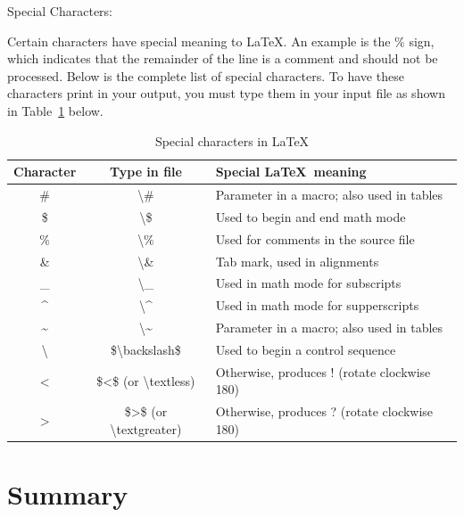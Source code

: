 \documentclass[a4paper,11pt,UTF8,openright]{book}
\begin{document}
Special Characters:

Certain characters have special meaning to \LaTeX. An example is the \% sign, which indicates that the remainder of the line is a comment and should not be processed. Below is the complete list of special characters. To have these characters print in your output, you must type them in your input file as shown in Table~\ref{tab:special characters} below.

\begin{center}
  \begin{table}[!htbp]
    \caption{Special characters in \LaTeX}
    \label{tab:special characters}
    \begin{tabular}{@{}ccl@{}}
      \toprule
      \textbf{Character} & \textbf{Type in file} & \textbf{Special \LaTeX\ meaning}  \\ 
      \midrule
      \#	& \textbackslash\# & Parameter in a macro; also used in tables \\
      \$	& \textbackslash\$ & Used to begin and end math mode \\
      \%	& \textbackslash\% & Used for comments in the source file \\
      \&	& \textbackslash\& & Tab mark, used in alignments \\
      \_	& \textbackslash\_ & Used in math mode for subscripts \\
      \^{}	& \textbackslash\^{} & Used in math mode for supperscripts \\
      \~{}	& \textbackslash\~{} & Parameter in a macro; also used in tables \\
      \textbackslash	& \$\textbackslash backslash\$ & Used to begin a control sequence \\
      $<$	& \$<\$ (or \textbackslash textless) & Otherwise, produces ! (rotate clockwise 180\degree) \\
      $>$	& \$>\$ (or \textbackslash textgreater) & Otherwise, produces ? (rotate clockwise 180\degree) \\
      \bottomrule
    \end{tabular}
  \end{table}
\end{center}



\chapter{Summary}
\lipsum[1-3]

{}

\end{document}
